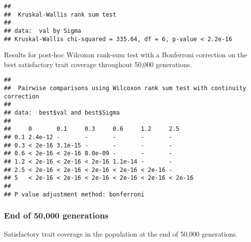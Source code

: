 \documentclass[]{book}
\newenvironment{Shaded}{\begin{snugshade}}{\end{snugshade}}
\newcommand{\DataTypeTok}[1]{\textcolor[rgb]{0.13,0.29,0.53}{#1}}
\newcommand{\KeywordTok}[1]{\textcolor[rgb]{0.13,0.29,0.53}{\textbf{#1}}}
\newcommand{\NormalTok}[1]{#1}
\newcommand{\OperatorTok}[1]{\textcolor[rgb]{0.81,0.36,0.00}{\textbf{#1}}}
\newcommand{\OtherTok}[1]{\textcolor[rgb]{0.56,0.35,0.01}{#1}}
\newcommand{\StringTok}[1]{\textcolor[rgb]{0.31,0.60,0.02}{#1}}
\begin{document}
\begin{verbatim}
## 
##  Kruskal-Wallis rank sum test
## 
## data:  val by Sigma
## Kruskal-Wallis chi-squared = 335.64, df = 6, p-value < 2.2e-16
\end{verbatim}

Results for post-hoc Wilcoxon rank-sum test with a Bonferroni correction on the best satisfactory trait coverage throughout 50,000 generations.

\begin{Shaded}
\end{Shaded}

\begin{verbatim}
## 
##  Pairwise comparisons using Wilcoxon rank sum test with continuity correction 
## 
## data:  best$val and best$Sigma 
## 
##     0       0.1     0.3     0.6     1.2     2.5    
## 0.1 2.4e-12 -       -       -       -       -      
## 0.3 < 2e-16 3.1e-15 -       -       -       -      
## 0.6 < 2e-16 < 2e-16 8.0e-09 -       -       -      
## 1.2 < 2e-16 < 2e-16 < 2e-16 1.1e-14 -       -      
## 2.5 < 2e-16 < 2e-16 < 2e-16 < 2e-16 < 2e-16 -      
## 5   < 2e-16 < 2e-16 < 2e-16 < 2e-16 < 2e-16 < 2e-16
## 
## P value adjustment method: bonferroni
\end{verbatim}

\hypertarget{end-of-50000-generations-18}{%
\subsubsection{End of 50,000 generations}\label{end-of-50000-generations-18}}

Satisfactory trait coverage in the population at the end of 50,000 generations.
\end{document}
